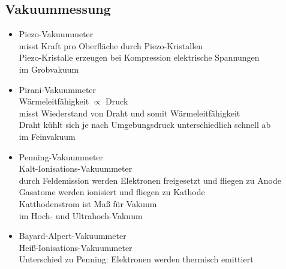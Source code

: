 \subsection{Vakuummessung}
\begin{itemize}
    \item Piezo-Vakuummeter\\
    \to misst Kraft pro Oberfläche durch Piezo-Kristallen\\
    \to Piezo-Kristalle erzeugen bei Kompression elektrische Spannungen\\
    \to im Grobvakuum
    \item Pirani-Vakuummeter\\
    \to Wärmeleitfähigkeit $\propto$ Druck \\
    \to misst Wiederstand von Draht und somit Wärmeleitfähigkeit\\
    \to Draht kühlt sich je nach Umgebungsdruck unterschiedlich schnell ab \\
    \to im Feinvakuum
    \item Penning-Vakuummeter\\
    \to Kalt-Ionisations-Vakuummeter\\
    \to durch Feldemission werden Elektronen freigesetzt und fliegen zu Anode\\ 
    \to Gasatome werden ionisiert und fliegen zu Kathode\\
    \to Katthodenstrom ist Maß für Vakuum\\ 
    \to im Hoch- und Ultrahoch-Vakuum
    \item Bayard-Alpert-Vakuummeter\\
    \to Heiß-Ionisations-Vakuummeter\\
    \to Unterschied zu Penning: Elektronen werden thermisch emittiert
\end{itemize}